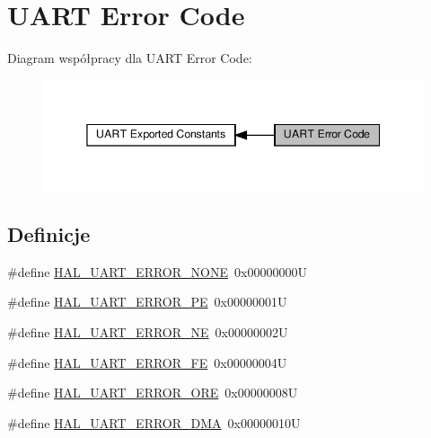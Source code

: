 \hypertarget{group___u_a_r_t___error___code}{}\section{U\+A\+RT Error Code}
\label{group___u_a_r_t___error___code}
Diagram współpracy dla U\+A\+RT Error Code\+:\nopagebreak
\begin{figure}[H]
\begin{center}
\leavevmode
\includegraphics[width=345pt]{group___u_a_r_t___error___code}
\end{center}
\end{figure}
\subsection*{Definicje}
\begin{DoxyCompactItemize}
\item 
\#define \hyperlink{group___u_a_r_t___error___code_ga275de35cb518c19c284764f3ecb1aac5}{H\+A\+L\+\_\+\+U\+A\+R\+T\+\_\+\+E\+R\+R\+O\+R\+\_\+\+N\+O\+NE}~0x00000000U
\item 
\#define \hyperlink{group___u_a_r_t___error___code_gad447a37701acd199dcb653ce32917970}{H\+A\+L\+\_\+\+U\+A\+R\+T\+\_\+\+E\+R\+R\+O\+R\+\_\+\+PE}~0x00000001U
\item 
\#define \hyperlink{group___u_a_r_t___error___code_ga4a4e32a346dd01f4c41c4fc27afbc72c}{H\+A\+L\+\_\+\+U\+A\+R\+T\+\_\+\+E\+R\+R\+O\+R\+\_\+\+NE}~0x00000002U
\item 
\#define \hyperlink{group___u_a_r_t___error___code_gaf23cb510d4dc2c8e05a45abfbf5f3457}{H\+A\+L\+\_\+\+U\+A\+R\+T\+\_\+\+E\+R\+R\+O\+R\+\_\+\+FE}~0x00000004U
\item 
\#define \hyperlink{group___u_a_r_t___error___code_gaedc030add6c499cf41be7f12dd95930c}{H\+A\+L\+\_\+\+U\+A\+R\+T\+\_\+\+E\+R\+R\+O\+R\+\_\+\+O\+RE}~0x00000008U
\item 
\#define \hyperlink{group___u_a_r_t___error___code_gac1d608ae3499a449cd6cd102e7f86605}{H\+A\+L\+\_\+\+U\+A\+R\+T\+\_\+\+E\+R\+R\+O\+R\+\_\+\+D\+MA}~0x00000010U
\end{DoxyCompactItemize}


